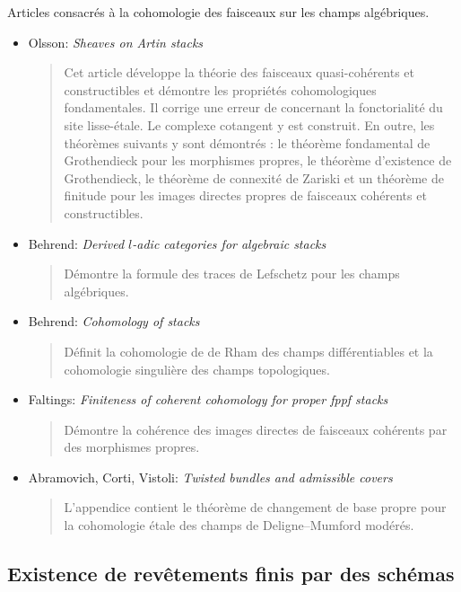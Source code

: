\noindent
Articles consacrés à la cohomologie des faisceaux sur les champs algébriques.
\begin{itemize}
\item Olsson: \emph{Sheaves on Artin stacks} \cite{olsson_sheaves}
\begin{quote}
Cet article développe la théorie des faisceaux quasi-cohérents et constructibles
et démontre les propriétés cohomologiques fondamentales. Il corrige une erreur de
\cite{LM-B} concernant la fonctorialité du site lisse-étale. Le complexe cotangent
y est construit. En outre, les théorèmes suivants y sont démontrés :
le théorème fondamental de Grothendieck pour les morphismes propres, le théorème
d'existence de Grothendieck, le théorème de connexité de Zariski et un théorème de
finitude pour les images directes propres de faisceaux cohérents et constructibles.
\end{quote}
\item Behrend: \emph{Derived $l$-adic categories for algebraic stacks}
\cite{behrend_derived}
\begin{quote}
Démontre la formule des traces de Lefschetz pour les champs algébriques.
\end{quote}
\item Behrend: \emph{Cohomology of stacks} \cite{behrend_cohomology}
\begin{quote}
Définit la cohomologie de de Rham des champs différentiables et la cohomologie
singulière des champs topologiques.
\end{quote}
\item Faltings:
\emph{Finiteness of coherent cohomology for proper fppf stacks}
\cite{faltings_finiteness}
\begin{quote}
Démontre la cohérence des images directes de faisceaux cohérents par des morphismes propres.
\end{quote}
\item Abramovich, Corti, Vistoli:
\emph{Twisted bundles and admissible covers} \cite{acv}
\begin{quote}
L'appendice contient le théorème de changement de base propre pour la cohomologie
étale des champs de Deligne--Mumford modérés.
\end{quote}
\end{itemize}


\subsection{Existence de revêtements finis par des schémas}
\label{subsection-finite-covers}


